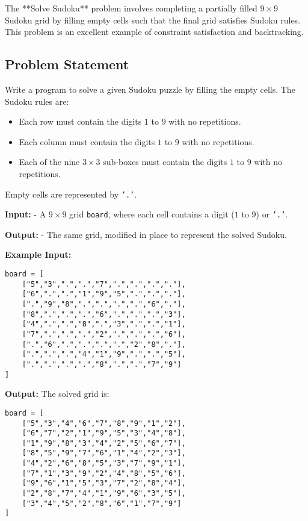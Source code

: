 
\label{problem:Solve_Sudoku}

The **Solve Sudoku** problem involves completing a partially filled \(9 \times 9\) Sudoku grid by filling empty cells such that the final grid satisfies Sudoku rules. This problem is an excellent example of constraint satisfaction and backtracking.

\subsection*{Problem Statement}
Write a program to solve a given Sudoku puzzle by filling the empty cells. The Sudoku rules are:
\begin{itemize}
    \item Each row must contain the digits \(1\) to \(9\) with no repetitions.
    \item Each column must contain the digits \(1\) to \(9\) with no repetitions.
    \item Each of the nine \(3 \times 3\) sub-boxes must contain the digits \(1\) to \(9\) with no repetitions.
\end{itemize}

Empty cells are represented by \texttt{'.'}.

\textbf{Input:}
- A \(9 \times 9\) grid \texttt{board}, where each cell contains a digit (\(1\) to \(9\)) or \texttt{'.'}.

\textbf{Output:}
- The same grid, modified in place to represent the solved Sudoku.

\textbf{Example Input:}
\begin{verbatim}
board = [
    ["5","3",".",".","7",".",".",".","."],
    ["6",".",".","1","9","5",".",".","."],
    [".","9","8",".",".",".",".","6","."],
    ["8",".",".",".","6",".",".",".","3"],
    ["4",".",".","8",".","3",".",".","1"],
    ["7",".",".",".","2",".",".",".","6"],
    [".","6",".",".",".",".","2","8","."],
    [".",".",".","4","1","9",".",".","5"],
    [".",".",".",".","8",".",".","7","9"]
]
\end{verbatim}

\textbf{Output:}
The solved grid is:
\begin{verbatim}
board = [
    ["5","3","4","6","7","8","9","1","2"],
    ["6","7","2","1","9","5","3","4","8"],
    ["1","9","8","3","4","2","5","6","7"],
    ["8","5","9","7","6","1","4","2","3"],
    ["4","2","6","8","5","3","7","9","1"],
    ["7","1","3","9","2","4","8","5","6"],
    ["9","6","1","5","3","7","2","8","4"],
    ["2","8","7","4","1","9","6","3","5"],
    ["3","4","5","2","8","6","1","7","9"]
]
\end{verbatim}

